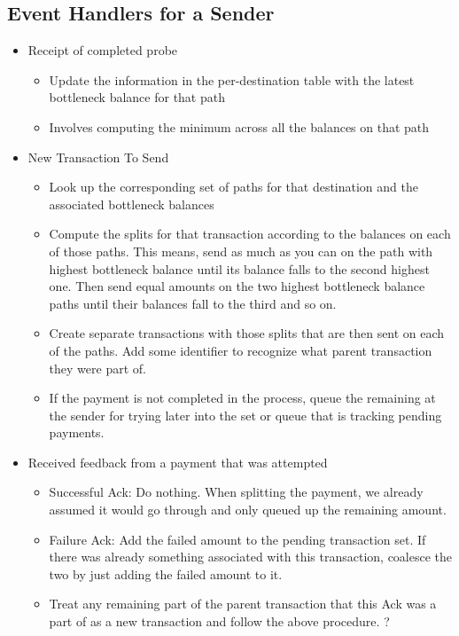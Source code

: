 \documentclass[a4paper]{article}
\begin{document}
\subsection{Event Handlers for a Sender}
\begin{itemize}
    \item Receipt of completed probe
        \begin{itemize}
            \item Update the information in the per-destination table with the latest bottleneck balance for that path
            \item Involves computing the minimum across all the balances on that path
        \end{itemize}

    \item New Transaction To Send
        \begin{itemize}
            \item Look up the corresponding set of paths for that destination and the associated bottleneck balances
            \item Compute the splits for that transaction according to the balances on each of those paths. This means, send as much as you can on the path with highest bottleneck balance 
                until its balance falls to the second highest one. Then send equal amounts on the two highest bottleneck balance paths until their balances fall to the third and so on. 
            \item Create separate transactions with those splits that are then sent on each of the paths. Add some identifier to recognize what parent transaction they were part of.
            \item If the payment is not completed in the process, queue the remaining at the sender for trying later into the set or queue that is tracking pending payments.
        \end{itemize}

    \item Received feedback from a payment that was attempted
        \begin{itemize}
            \item Successful Ack: Do nothing. When splitting the payment, we already assumed it would go through and only queued up the remaining amount.
            \item Failure Ack: Add the failed amount to the pending transaction set. If there was already something associated with this transaction, coalesce the two by just adding the failed amount to it.
            \item Treat any remaining part of the parent transaction that this Ack was a part of as a new transaction and follow the above procedure. ?
        \end{itemize}
\end{itemize}
\end{document}
